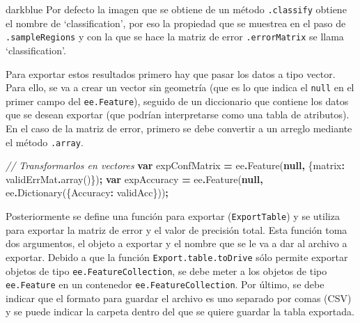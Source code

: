 \documentclass[
  12pt,
  letterpaper,
  twoside]{book}
\newenvironment{Shaded}{\begin{snugshade}}{\end{snugshade}}
\newcommand{\CommentTok}[1]{\textcolor[rgb]{0.56,0.35,0.01}{\textit{#1}}}
\newcommand{\DataTypeTok}[1]{\textcolor[rgb]{0.13,0.29,0.53}{#1}}
\newcommand{\FunctionTok}[1]{\textcolor[rgb]{0.00,0.00,0.00}{#1}}
\newcommand{\KeywordTok}[1]{\textcolor[rgb]{0.13,0.29,0.53}{\textbf{#1}}}
\newcommand{\NormalTok}[1]{#1}
\newcommand{\OperatorTok}[1]{\textcolor[rgb]{0.81,0.36,0.00}{\textbf{#1}}}
\begin{document}
\begin{bluebox2}

\begin{awesomeblock}{5pt}{\faLightbulb}{darkblue}
Por defecto la imagen que se obtiene de un método \texttt{.classify} obtiene el nombre de `classification', por eso la propiedad que se muestrea en el paso de \texttt{.sampleRegions} y con la que se hace la matriz de error \texttt{.errorMatrix} se llama `classification'.

\end{awesomeblock}

\end{bluebox2}

Para exportar estos resultados primero hay que pasar los datos a tipo vector. Para ello, se va a crear un vector sin geometría (que es lo que indica el \texttt{null} en el primer campo del \texttt{ee.Feature}), seguido de un diccionario que contiene los datos que se desean exportar (que podrían interpretarse como una tabla de atributos). En el caso de la matriz de error, primero se debe convertir a un arreglo mediante el método \texttt{.array}.

\begin{Shaded}
\begin{Highlighting}[]
\CommentTok{// Transformarlos en vectores}
\KeywordTok{var}\NormalTok{ expConfMatrix }\OperatorTok{=}\NormalTok{  ee}\OperatorTok{.}\FunctionTok{Feature}\NormalTok{(}\KeywordTok{null}\OperatorTok{,}\NormalTok{ \{}\DataTypeTok{matrix}\OperatorTok{:}\NormalTok{ validErrMat}\OperatorTok{.}\FunctionTok{array}\NormalTok{()\})}\OperatorTok{;}
\KeywordTok{var}\NormalTok{ expAccuracy }\OperatorTok{=}\NormalTok{ ee}\OperatorTok{.}\FunctionTok{Feature}\NormalTok{(}\KeywordTok{null}\OperatorTok{,}\NormalTok{ ee}\OperatorTok{.}\FunctionTok{Dictionary}\NormalTok{(\{}\DataTypeTok{Accuracy}\OperatorTok{:}\NormalTok{ validAcc\}))}\OperatorTok{;}
\end{Highlighting}
\end{Shaded}

Posteriormente se define una función para exportar (\texttt{ExportTable}) y se utiliza para exportar la matriz de error y el valor de precisión total. Esta función toma dos argumentos, el objeto a exportar y el nombre que se le va a dar al archivo a exportar. Debido a que la función \texttt{Export.table.toDrive} sólo permite exportar objetos de tipo \texttt{ee.FeatureCollection}, se debe meter a los objetos de tipo \texttt{ee.Feature} en un contenedor \texttt{ee.FeatureCollection}. Por último, se debe indicar que el formato para guardar el archivo es uno separado por comas (CSV) y se puede indicar la carpeta dentro del que se quiere guardar la tabla exportada.
\end{document}
